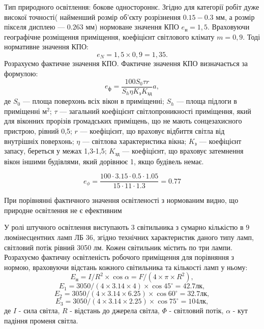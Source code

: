 Тип природного освітлення: бокове одностороннє.
Згідно \cite{DBN} для категорії робіт дуже високої точності(
найменший розмір об’єкту розрізнення $0.15-0.3$ мм,
а розмір пікселя дисплею --- $0.263$ мм)
нормоване значення КПО $e_\text{н} = 1,5$.
Враховуючи географічне розміщення приміщення,
коефіцієнт світлового клімату $m = 0,9$.
Тоді нормативне значення КПО: 
\begin{equation*}
e_{N} = 1,5 \times 0,9 = 1,35.
\end{equation*}
Розрахуємо фактичне значення КПО.
Фактичне значення КПО визначається за формулою: 
\begin{equation*}
e_\textbf{ф}=\dfrac{100S_0\tau r}{S_h \eta K_\text{з}K_\text{зд}}a,
\end{equation*}
 де
$S_0$ --- площа поверхонь всіх вікон в приміщенні;
$S_h$ --- площа підлоги в приміщенні м$^2$;
$\tau$ --- загальний коефіцієнт світлопроникності приміщення,
який для віконних прорізів громадських приміщень,
що не мають сонцезахисного пристрою, рівний 0,5;
$r$ --- коефіцієнт, що враховує відбиття світла від внутрішніх поверхонь;
$\eta$ --- світлова характеристика вікна; 
$K_\text{з}$ --- коефіцієнт запасу, береться у межах 1,3-1,5;
$K_\text{зд}$ --- коефіцієнт, що враховує затемнення вікон іншими будівлями,
який дорівнює 1, якщо будівель немає.

\begin{equation*}
  e_\phi
  =\dfrac{100 \cdot 3.15 \cdot 0.5 \cdot 1.05}{15 \cdot 11 \cdot 1.3}
  = 0.77 
\end{equation*} 

При порівнянні фактичного значення освітленості з нормованим видно,
що природне освітлення не є ефективним

У ролі штучного освітлення виступають $3$ світильника з сумарно кількістю в
$9$ люмінесцентних ламп ЛБ 36, згідно технічних характеристик даного типу ламп,
світловий потік рівний 3050 лм.
Кожен світильник містить по три  лампи. 
Розрахуємо фактичну освітленість робочого приміщення для порівняння з нормою,
враховуючи відстань кожного світильника та кількості ламп у ньому:
\begin{equation*}
  E_{\text{н}} = I/R^{2} \times \cos\alpha = F/(4 \times \pi \times R^{2} ),
\end{equation*}
\begin{equation*}
  E_{1} = 3050/(4\times 3.14\times 4)\times \cos{45^{\circ}} = 42.7 \text{лк},
\end{equation*}
\begin{equation*}
  E_{2} = 3050/(4\times 3.14\times 6.25)\times \cos{60^{\circ}} = 32.7\text{лк},
\end{equation*}
\begin{equation*}
  E_{3} = 3050/(4\times 3.14\times 2.25)\times \cos{75^{\circ}} = 104 \text{лк},
\end{equation*}
де $I$ - сила світла, $R$ - відстань до джерела світла, 
$\Phi$ - світловий потік, $\alpha$ - кут падіння променя світла.

